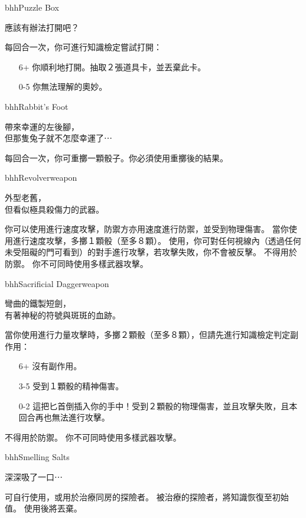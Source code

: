 \linebreak[0]%
\begin{ItemCard}{bhh}{Puzzle Box}{}
  \begin{CardStory}
    應該有辦法打開吧？
  \end{CardStory}
  每回合一次，你可進行知識檢定嘗試打開\ThisName{}：
  \begin{itemize}
    \item[6+] 你順利地打開\ThisName{}。抽取２張道具卡，並丟棄此卡。
    \item[0-5] 你無法理解\ThisName{}的奧妙。
  \end{itemize}
\end{ItemCard}%
\linebreak[0]%
\begin{ItemCard}{bhh}{Rabbit’s Foot}{}
  \begin{CardStory}
    帶來幸運的左後腳，\\
    但那隻兔子就不怎麼幸運了⋯
  \end{CardStory}
  每回合一次，你可重擲一顆骰子。你必須使用重擲後的結果。\smallbreak
\end{ItemCard}%
\linebreak[0]%
\begin{ItemCard}{bhh}{Revolver}{weapon}
  \begin{CardStory}
    外型老舊，\\
    但看似極具殺傷力的武器。
  \end{CardStory}
  你可以使用\ThisName{}進行速度攻擊，防禦方亦用速度進行防禦，並受到物理傷害。\smallbreak
  當你使用\ThisName{}進行速度攻擊，多擲１顆骰（至多８顆）。\smallbreak
  使用\ThisName{}，你可對任何視線內（透過任何未受阻礙的門可看到）的對手進行攻擊，若攻擊失敗，你不會被反擊。\smallbreak
  \ThisName{}不得用於防禦。\smallbreak
  你不可同時使用多樣武器攻擊。\smallbreak
\end{ItemCard}%
\linebreak[0]%
\begin{ItemCard}{bhh}{Sacrificial Dagger}{weapon}
  \begin{CardStory}
    彎曲的鐵製短劍，\\
    有著神秘的符號與斑斑的血跡。
  \end{CardStory}
  當你使用\ThisName{}進行力量攻擊時，多擲２顆骰（至多８顆），但請先進行知識檢定判定副作用：
  \begin{itemize}
    \item[6+] 沒有副作用。
    \item[3-5] 受到１顆骰的精神傷害。
    \item[0-2] 這把匕首倒插入你的手中！受到２顆骰的物理傷害，並且攻擊失敗，且本回合再也無法進行攻擊。
  \end{itemize}
  \ThisName{}不得用於防禦。\smallbreak
  你不可同時使用多樣武器攻擊。\smallbreak
\end{ItemCard}%
\linebreak[0]%
\begin{ItemCard}{bhh}{Smelling Salts}{}
  \begin{CardStory}
    深深吸了一口⋯
  \end{CardStory}
  可自行使用，或用於治療同房的探險者。\smallbreak
  被\ThisName{}治療的探險者，將知識恢復至初始值。\smallbreak
  使用後將\ThisName{}丟棄。\smallbreak
\end{ItemCard}%
